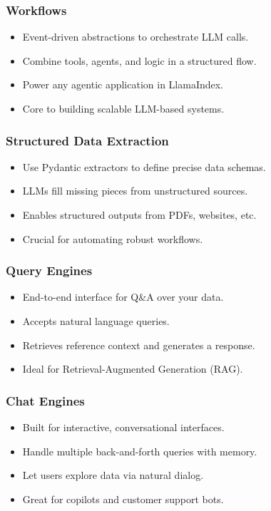 \begin{frame}[fragile]\frametitle{Workflows}
\begin{itemize}
  \item Event-driven abstractions to orchestrate LLM calls.
  \item Combine tools, agents, and logic in a structured flow.
  \item Power any agentic application in LlamaIndex.
  \item Core to building scalable LLM-based systems.
\end{itemize}
\end{frame}

\begin{frame}[fragile]\frametitle{Structured Data Extraction}
\begin{itemize}
  \item Use Pydantic extractors to define precise data schemas.
  \item LLMs fill missing pieces from unstructured sources.
  \item Enables structured outputs from PDFs, websites, etc.
  \item Crucial for automating robust workflows.
\end{itemize}
\end{frame}

\begin{frame}[fragile]\frametitle{Query Engines}
\begin{itemize}
  \item End-to-end interface for Q\&A over your data.
  \item Accepts natural language queries.
  \item Retrieves reference context and generates a response.
  \item Ideal for Retrieval-Augmented Generation (RAG).
\end{itemize}
\end{frame}

\begin{frame}[fragile]\frametitle{Chat Engines}
\begin{itemize}
  \item Built for interactive, conversational interfaces.
  \item Handle multiple back-and-forth queries with memory.
  \item Let users explore data via natural dialog.
  \item Great for copilots and customer support bots.
\end{itemize}
\end{frame}

